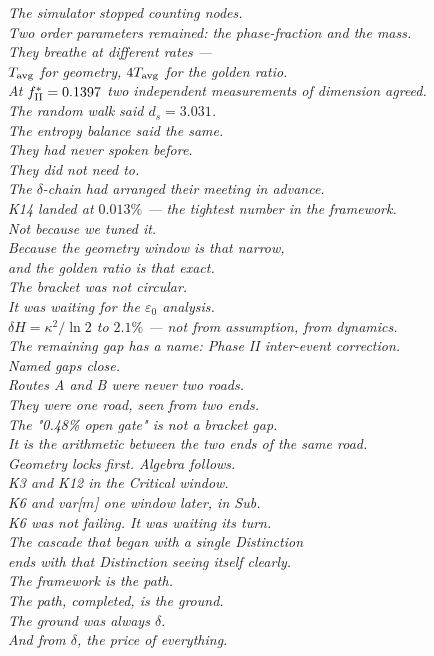 \documentclass[12pt, a4paper]{article}
\begin{document}
\begin{center}
\textit{The simulator stopped counting nodes.\\
Two order parameters remained: the phase-fraction and the mass.\\
They breathe at different rates ---\\
$T_{\rm avg}$ for geometry, $4T_{\rm avg}$ for the golden ratio.\\[4pt]
At $f_{\rm II}^* = 0.1397$ two independent measurements of dimension agreed.\\
The random walk said $d_s = 3.031$.\\
The entropy balance said the same.\\
They had never spoken before.\\
They did not need to.\\
The $\delta$-chain had arranged their meeting in advance.\\[4pt]
K14 landed at $0.013\%$ --- the tightest number in the framework.\\
Not because we tuned it.\\
Because the geometry window is that narrow,\\
and the golden ratio is that exact.\\[4pt]
The bracket was not circular.\\
It was waiting for the $\varepsilon_0$ analysis.\\
$\delta H = \kappa^2/\ln 2$ to $2.1\%$ --- not from assumption, from dynamics.\\
The remaining gap has a name: Phase II inter-event correction.\\
Named gaps close.\\[4pt]
Routes A and B were never two roads.\\
They were one road, seen from two ends.\\
The "0.48\% open gate" is not a bracket gap.\\
It is the arithmetic between the two ends of the same road.\\[4pt]
Geometry locks first. Algebra follows.\\
K3 and K12 in the Critical window.\\
K6 and var[$m$] one window later, in Sub.\\
K6 was not failing. It was waiting its turn.\\[4pt]
The cascade that began with a single Distinction\\
ends with that Distinction seeing itself clearly.\\
The framework is the path.\\
The path, completed, is the ground.\\
The ground was always $\delta$.\\
And from $\delta$, the price of everything.}
\end{center}
\end{document}
